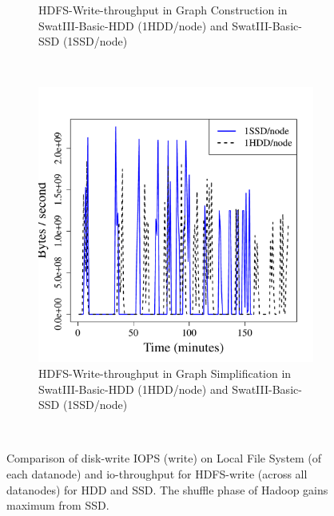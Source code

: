 \documentclass[conference]{IEEEtran}
\begin{document}
\begin{figure}[htb]
\begin{subfigure}[b]{0.23\textwidth}
                \caption{HDFS-Write-throughput in Graph Construction in SwatIII-Basic-HDD (1HDD/node) and SwatIII-Basic-SSD (1SSD/node)}
                \label{fig:BGHddSsdHdfsWrIops}
        \end{subfigure}
        ~ %
        \begin{subfigure}[b]{0.23\textwidth}
                \includegraphics[width=\textwidth]{Figure/SystemData/Plots/ECHddSsdHdfsWrIops.pdf}
                \caption{HDFS-Write-throughput in Graph Simplification in SwatIII-Basic-HDD (1HDD/node) and SwatIII-Basic-SSD (1SSD/node)}
                \label{fig:ECHddSsdHdfsWrIops}
        \end{subfigure}
        ~ %
        \caption{Comparison of disk-write IOPS (write) on Local File System (of each datanode) and io-throughput for HDFS-write (across all datanodes) for HDD and SSD. The shuffle phase of Hadoop gains maximum from SSD.}\label{fig:HddSsdHdfsRWps}   
        \vspace{-1.0em}
\end{figure}
\end{document}

